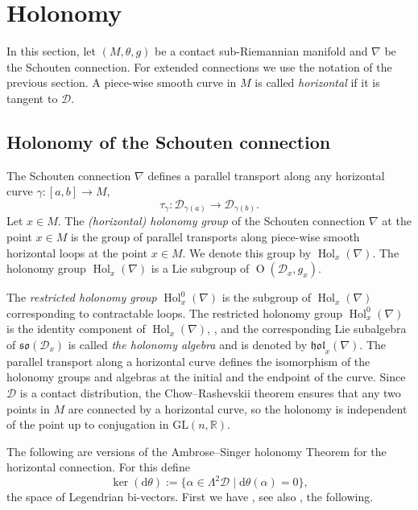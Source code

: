 \documentclass{amsart}
\theoremstyle{plain}
\theoremstyle{definition}
\newcommand{\Hol}{\operatorname{Hol}}
\newcommand{\Or}{\operatorname{O}}
\def\so{\mathfrak{so}}
\newcommand{\hol}{\mathfrak{hol}}
\newcommand{\Real}{\mathbb{R}}
\newcommand{\1}{\mathbf{1}}
\newcommand{\D}{{\mathcal D}}
\renewcommand{\d}{\mathrm{d}}
\newcommand{\+}{\oplus}
\newcommand{\tcom}[1]{
 \marginpar{{\scriptsize  T: #1 }}}
\newcommand{\acom}[1]{
 \marginpar{{\scriptsize A: #1 }}}
\begin{document}
\section{Holonomy}\label{secHol}
In this section, let $(M,\theta,g)$ be a contact sub-Riemannian manifold and $\nabla$ be the Schouten connection. For extended connections we  use the notation of the previous section.
 A piece-wise smooth curve in $M$ is called {\it horizontal} if it is tangent to $\D$.

\subsection{Holonomy of the Schouten connection}
The Schouten connection $\nabla$ defines a parallel transport along any  horizontal curve $\gamma:[a,b]\to M$,  
\begin{equation}\label{tau}\tau_\gamma: \D_{\gamma(a)}\to \D_{\gamma(b)}.\end{equation} 
Let $x\in M$. The {\it (horizontal) holonomy group} of the Schouten connection $\nabla$ at the point $x\in M$ is the group of parallel transports along piece-wise smooth horizontal loops at the point $x\in M$. We denote this group by $\Hol_x(\nabla)$.  The holonomy group $\Hol_x(\nabla)$ is a Lie subgroup of $\Or (\D_x,g_x)$. 


The {\it restricted holonomy group} $\Hol^0_x(\nabla)$ is the subgroup of 
$\Hol_x(\nabla)$ corresponding to contractable loops. The restricted holonomy group $\Hol^0_x(\nabla)$ is the identity component of $\Hol_x(\nabla)$, \cite{CGJK,FGR,HMCK}, and 
the corresponding Lie subalgebra of $\so (\D_x)$ is called {\it the holonomy algebra} and is denoted by $\hol_x(\nabla)$. The parallel transport along a horizontal curve defines the isomorphism of the holonomy groups and algebras at the initial and the endpoint of the curve. Since $\D$ is a contact distribution, the Chow--Rashevskii theorem ensures that any two points in $M$ are connected by a horizontal curve, so the holonomy is independent of the point up to conjugation in $\mathrm{GL}(n,\Real)$.

The following are versions of the Ambrose--Singer holonomy Theorem for the horizontal connection.
For this define 
\[\ker(\d\theta):=\{\alpha \in \Lambda^2 \D\mid \d\theta(\alpha)=0\},\]
the space of Legendrian bi-vectors.  
First we have  \cite[Corollary 2.4]{FGR}, see also \cite{CGJK}, the following.
\end{document}
